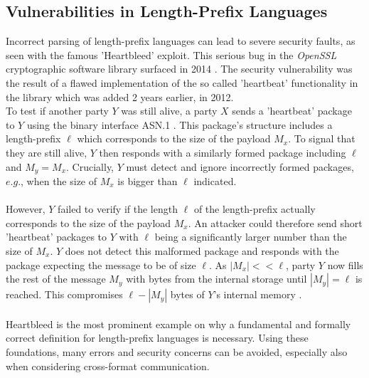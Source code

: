 \subsection{Vulnerabilities in Length-Prefix Languages}
\label{1.3}
Incorrect parsing of length-prefix languages can lead to severe security faults, as seen with the famous 'Heartbleed' exploit. 
This serious bug in the \textit{OpenSSL} cryptographic software library surfaced in 2014 \cite{heartbleed-wiki}. The security vulnerability was the result of a flawed implementation of the so called 'heartbeat' functionality in the library which was added 2 years earlier, in 2012.\\ 
To test if another party $Y$ was still alive, a party $X$ sends a 'heartbeat' package to $Y$ using the binary interface ASN.1 \cite{ASN.1}. This package's structure includes a length-prefix $\ell$ which corresponds to the size of the payload $M_x$. To signal that they are still alive, $Y$ then responds with a similarly formed package including $\ell$ and $M_y=M_x$. Crucially, $Y$ must detect and ignore incorrectly formed packages, $e.g.$, when the size of $M_x$ is bigger than $\ell$ indicated.
\\\\However, $Y$ failed to verify if the length $\ell$ of the length-prefix actually corresponds to the size of the payload $M_x$.
An attacker could therefore send short 'heartbeat' packages to $Y$ with $\ell$ being a significantly larger number than the size of $M_x$. $Y$ does not detect this malformed package and responds with the package expecting the message to be of size $\ell$. As $|M_x| << \ell$, party $Y$ now fills the rest of the message $M_y$ with bytes from the internal storage until $|M_y| = \ell$ is reached. This compromises $\ell-|M_y|$ bytes of $Y$'s internal memory \cite{Heartbeat-info}\cite{heartbleed-site}. \\\\
Heartbleed is the most prominent example on why a fundamental and formally correct definition for length-prefix languages is necessary. Using these foundations, many errors and security concerns can be avoided, especially also when considering cross-format communication.

